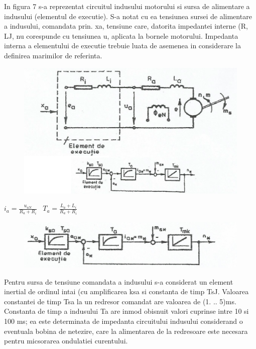 \documentclass[11pt]{article}
\begin{document}
In figura 7 s-a reprezentat circuitul indusului motorului si sursa de alimentare a indusului (elementul de executie). S-a notat cu ea tensiunea sursei de alimentare a indusului, comandata prin. xa, tensiune care, datorita impedantei interne (R, LJ, nu corespunde cu tensiunea u, aplicata la bornele motorului. Impedanta interna a elementului de executie trebuie luata de asemenea in considerare la definirea marimilor de referinta.
\begin{figure}[H]
	\centering
	\includegraphics[width=.8\linewidth]{fig8_fin.png}
	\label{fig:test2}
\end{figure}
\begin{center}
	$i_a=\frac{u_{aN}}{R_a+R_i}$ \ 	$T_a=\frac{L_a+L_i}{R_a+R_i}$
\end{center}
\begin{figure}[H]
	\centering
	\includegraphics[width=.8\linewidth]{fig9.png}
	\label{fig:test2}
\end{figure}
Pentru sursa de tensiune comandata a indusului s-a considerat un element inertial de ordinul intai (cu amplificarea ksa si constanta de timp TsJ. Valoarea constantei de timp Tsa la un redresor comandat are valoarea de (1. .. 5)ms. Constanta de timp a indusului Ta are inmod obisnuit valori cuprinse intre 10 si 100 ms; ea este determinata de impedanta circuitului indusului considerand o eventuala bobina de netezire, care la alimentarea de la redresoare este necesara pentru micsorarea ondulatiei curentului. 
\end{document}
